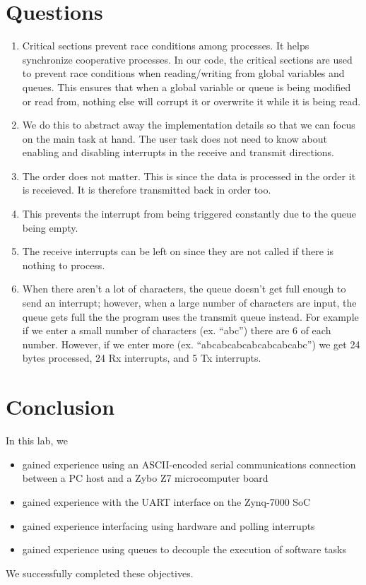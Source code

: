 \documentclass[11pt, letterpaper, titlepage]{article}
\begin{document}
\newpage
\section{Questions}
\begin{enumerate}
  \item Critical sections prevent race conditions among processes. It helps synchronize cooperative processes. In our code, the critical sections are used to prevent race conditions when reading/writing from global variables and queues. This ensures that when a global variable or queue is being modified or read from, nothing else will corrupt it or overwrite it while it is being read. 
  \item We do this to abstract away the implementation details so that we can focus on the main task at hand. The user task does not need to know about enabling and disabling interrupts in the receive and transmit directions.
  \item The order does not matter. This is since the data is processed in the order it is receieved. It is therefore transmitted back in order too.
  \item This prevents the interrupt from being triggered constantly due to the queue being empty.
  \item The receive interrupts can be left on since they are not called if there is nothing to process.
  \item When there aren't a lot of characters, the queue doesn't get full enough to send an interrupt; however, when a large number of characters are input, the queue gets full the the program uses the transmit queue instead. For example if we enter a small number of characters (ex. ``abc'') there are 6 of each number. However, if we enter more (ex. ``abcabcabcabcabcabcabc'') we get 24 bytes processed, 24 Rx interrupts, and 5 Tx interrupts.
\end{enumerate}

\newpage

\section{Conclusion}
In this lab, we
\begin{itemize}
  \item gained experience using an ASCII-encoded serial communications connection between a PC host and a Zybo Z7 microcomputer board
  \item gained experience with the UART interface on the Zynq-7000 SoC
  \item gained experience interfacing using hardware and polling interrupts
  \item gained experience using queues to decouple the execution of software tasks
\end{itemize}
We successfully completed these objectives. 
\end{document}
